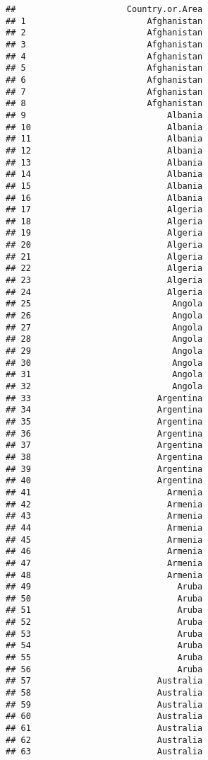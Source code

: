 \documentclass[]{article}
\begin{document}
\begin{verbatim}
##                      Country.or.Area
## 1                        Afghanistan
## 2                        Afghanistan
## 3                        Afghanistan
## 4                        Afghanistan
## 5                        Afghanistan
## 6                        Afghanistan
## 7                        Afghanistan
## 8                        Afghanistan
## 9                            Albania
## 10                           Albania
## 11                           Albania
## 12                           Albania
## 13                           Albania
## 14                           Albania
## 15                           Albania
## 16                           Albania
## 17                           Algeria
## 18                           Algeria
## 19                           Algeria
## 20                           Algeria
## 21                           Algeria
## 22                           Algeria
## 23                           Algeria
## 24                           Algeria
## 25                            Angola
## 26                            Angola
## 27                            Angola
## 28                            Angola
## 29                            Angola
## 30                            Angola
## 31                            Angola
## 32                            Angola
## 33                         Argentina
## 34                         Argentina
## 35                         Argentina
## 36                         Argentina
## 37                         Argentina
## 38                         Argentina
## 39                         Argentina
## 40                         Argentina
## 41                           Armenia
## 42                           Armenia
## 43                           Armenia
## 44                           Armenia
## 45                           Armenia
## 46                           Armenia
## 47                           Armenia
## 48                           Armenia
## 49                             Aruba
## 50                             Aruba
## 51                             Aruba
## 52                             Aruba
## 53                             Aruba
## 54                             Aruba
## 55                             Aruba
## 56                             Aruba
## 57                         Australia
## 58                         Australia
## 59                         Australia
## 60                         Australia
## 61                         Australia
## 62                         Australia
## 63                         Australia

\end{verbatim}
\end{document}
